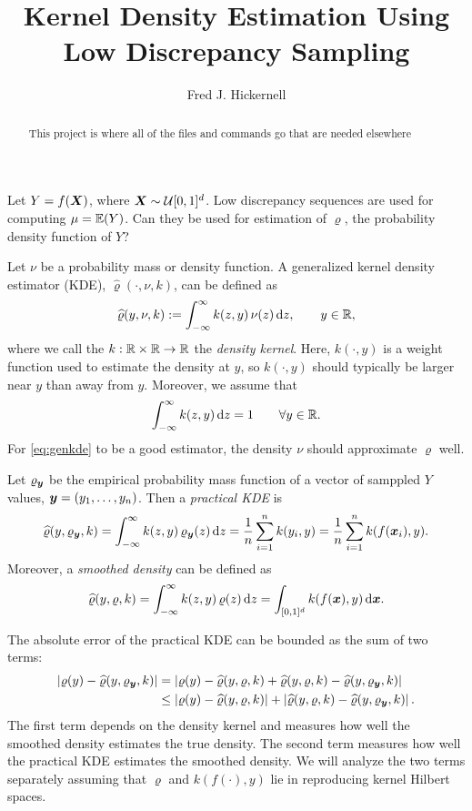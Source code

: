 \documentclass{amsart}
\newcommand{\hvarrho}{\widehat{\varrho}}
\begin{document}
\title{Kernel Density Estimation Using Low Discrepancy Sampling}
\author{Fred J. Hickernell}
\begin{abstract}This project is where all of the files and commands go that are needed elsewhere
\end{abstract}

\maketitle

Let $Y = f(\boldsymbol{X})$, where $\boldsymbol{X} \sim \mathcal{U}[0,1]^d$.  Low discrepancy sequences are used for computing  $\mu = \operatorname{\mathbb{E}}(Y)$.  Can they be used for estimation of $\varrho$, the probability density function of $Y$?

Let $\nu$ be a probability mass or density function.  A generalized kernel density estimator (KDE), $\hvarrho(\cdot,\nu,k)$, can be defined as
\begin{equation}
	\label{eq:genkde}
\hvarrho(y,\nu,k) := \int_{-\infty}^{\infty} k(z,y) \, \nu(z) \, \dif z, \qquad y \in \reals,
\end{equation}
where we call the $k:\mathbb{R} \times \mathbb{R} \to \mathbb{R}$ the \emph{density kernel}. Here, $k(\cdot,y)$ is a weight function used to estimate the density at $y$, so $k(\cdot,y)$ should typically be larger near $y$ than away from $y$.   Moreover, we assume that
\begin{equation}
	\label{eq:kintegral}
	\int_{-\infty}^{\infty} k(z,y) \, {\rm d} z = 1 \qquad \forall y \in \mathbb{R}.
\end{equation}
For \eqref{eq:genkde} to be a good estimator, the density $\nu$ should approximate $\varrho$ well.

Let $\varrho_{\boldsymbol{y}}$ be the empirical probability mass function of a vector of samppled $Y$ values, $\boldsymbol{y} = (y_1, \ldots, y_n)$.  Then a \emph{practical KDE} is
\begin{equation*}
\hvarrho(y,\varrho_{\vy},k) = \int_{-\infty}^{\infty} k(z,y) \, \varrho_{\vy}(z) \, \dif z = \frac 1n \sum_{i=1}^n k(y_i,y) \\
 = \frac 1n \sum_{i=1}^n k(f(\vx_i),y) .
\end{equation*}
Moreover, a \emph{smoothed density} can be defined as
\[
\hvarrho(y,\varrho,k) = \int_{-\infty}^{\infty} k(z,y) \, \varrho(z) \, \dif z = \int_{[0,1]^d} k(f(\vx),y) \,  \dif \vx.
\]

The absolute error of the practical KDE  can be bounded as the sum of two terms:
\begin{align*}
    \abs{\varrho(y) - \hvarrho(y,\varrho_{\vy},k)} & =
     \abs{\varrho(y) - \hvarrho(y,\varrho,k) + \hvarrho(y,\varrho,k) - \hvarrho(y,\varrho_{\vy},k)} \\
     & \le  \abs{\varrho(y) - \hvarrho(y,\varrho,k)} + \abs{\hvarrho(y,\varrho,k) - \hvarrho(y,\varrho_{\vy},k)}.
\end{align*}
The first term depends on the density kernel and measures how well the smoothed density estimates the true density.  The second term measures how well the practical KDE estimates the smoothed density.
We will analyze the two terms separately assuming that $\varrho$ and $k(f(\cdot),y)$ lie in reproducing kernel Hilbert spaces.
\end{document}

